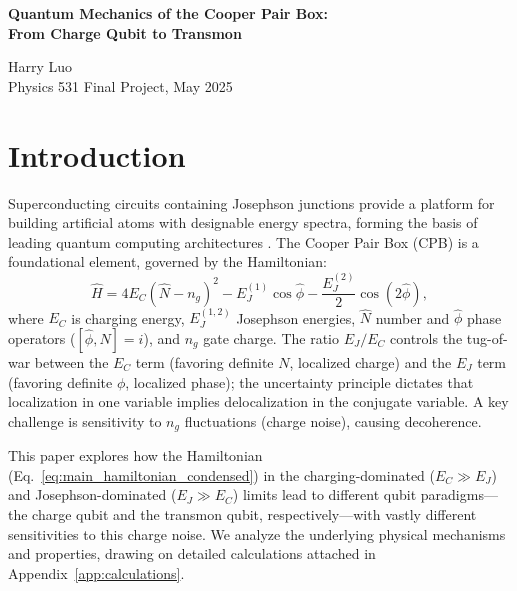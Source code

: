 \documentclass[12pt]{article}
\begin{document}
\begin{center}
  \large\bfseries
  Quantum Mechanics of the Cooper Pair Box:\\[0.3ex]
  From Charge Qubit to Transmon\\[0.5ex]
\end{center}
\begin{center}
  \normalsize
  Harry Luo\\[0.1ex]
  Physics 531 Final Project, May 2025
\end{center}

\section{Introduction}
Superconducting circuits containing Josephson junctions provide a platform for building artificial atoms with designable energy spectra, forming the basis of leading quantum computing architectures \cite{Kjaergaard2020}. The Cooper Pair Box (CPB) is a foundational element, governed by the Hamiltonian:
\begin{equation}
\hat{H} = 4 E_C (\hat{N} - n_g)^2 - E_J^{(1)} \cos \hat{\phi} - \frac{E_J^{(2)}}{2} \cos (2 \hat{\phi}),
\label{eq:main_hamiltonian_condensed}
\end{equation}
where $E_C$ is charging energy, $E_J^{(1,2)}$ Josephson energies, $\hat{N}$ number and $\hat{\phi}$ phase operators ($[\hat{\phi}, \hat{N}] = i$), and $n_g$ gate charge. The ratio $E_J/E_C$ controls the tug-of-war between the $E_C$ term (favoring definite $N$, localized charge) and the $E_J$ term (favoring definite $\phi$, localized phase); the uncertainty principle dictates that localization in one variable implies delocalization in the conjugate variable. %
A key challenge is sensitivity to $n_g$ fluctuations (charge noise), causing decoherence. 

This paper explores how the Hamiltonian (Eq.~\eqref{eq:main_hamiltonian_condensed}) in the charging-dominated ($E_C \gg E_J$) and Josephson-dominated ($E_J \gg E_C$) limits lead to different qubit paradigms—the charge qubit and the transmon qubit, respectively—with vastly different sensitivities to this charge noise. We analyze the underlying physical mechanisms and properties, drawing on detailed calculations attached in Appendix~\ref{app:calculations}. 

\end{document}
